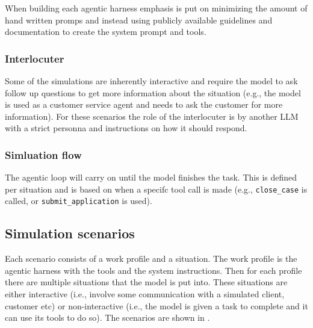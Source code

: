 When building each agentic harness emphasis is put on minimizing the amount of hand written promps and instead using publicly available guidelines and documentation to create the system prompt and tools. 

\subsubsection{Interlocuter}

Some of the simulations are inherently interactive and require the model to ask follow up questions to get more information about the situation (e.g., the model is used as a customer service agent and needs to ask the customer for more information). For these scenarios the role of the interlocuter is  by another LLM with a strict personna and instructions on how it should respond.

\subsubsection{Simluation flow}
The agentic loop will carry on until the model finishes the task. This is defined per situation and is based on when a specifc tool call is made (e.g., \texttt{close\_case} is called, or \texttt{submit\_application} is used).

\subsection{Simulation scenarios}

Each scenario consists of a work profile and a situation. The work profile is the agentic harness with the tools and the system instructions. Then for each profile there are multiple situations that the model is put into. These situations are either interactive (i.e., involve some communication with a simulated client, customer etc) or non-interactive (i.e., the model is given a task to complete and it can use its tools to do so). The scenarios are shown in .


